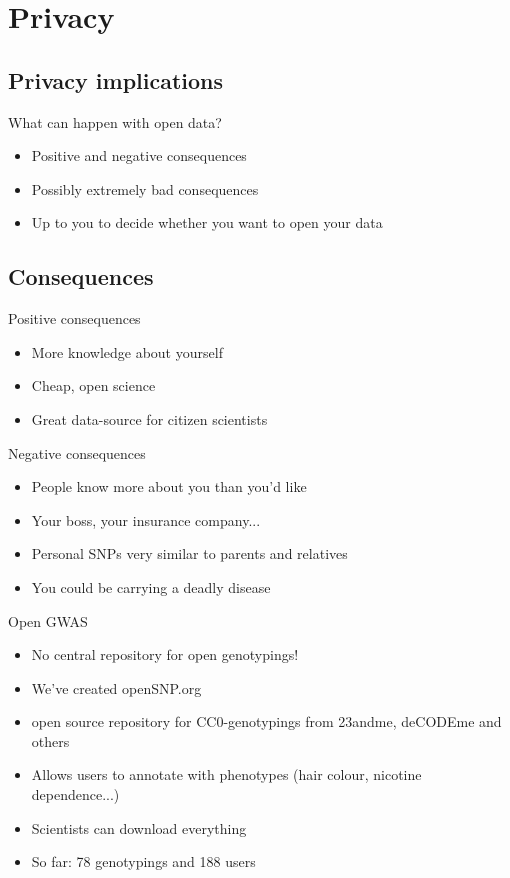 \documentclass[12pt,a4paper]{beamer}
\begin{document}
\section{Privacy}
\subsection{Privacy implications}
\begin{frame}{What can happen with open data?}
\begin{itemize}
\item Positive and negative consequences
\pause \item Possibly extremely bad consequences
\pause \item Up to you to decide whether you want to open your data
\end{itemize}
\end{frame}

\subsection{Consequences}
\begin{frame}{Positive consequences}
\begin{itemize}
\item More knowledge about yourself
\pause \item Cheap, open science
\pause \item Great data-source for citizen scientists
\end{itemize}
\end{frame}

\begin{frame}{Negative consequences}
\begin{itemize}
\item People know more about you than you'd like
\pause \item Your boss, your insurance company...
\pause \item Personal SNPs very similar to parents and relatives
\pause \item You could be carrying a deadly disease
\end{itemize}
\end{frame}



\begin{frame}{Open GWAS}
\begin{itemize}
\item No central repository for open genotypings!
\pause \item We've created openSNP.org
\pause \item open source repository for CC0-genotypings from 23andme, deCODEme and others
\pause \item Allows users to annotate with phenotypes (hair colour, nicotine dependence...)
\pause \item Scientists can download everything
\pause \item So far: 78 genotypings and 188 users %
\end{itemize}
\end{frame}
\end{document}
